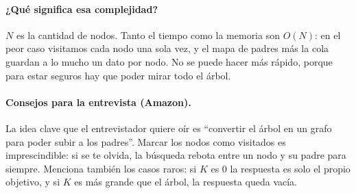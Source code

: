

\paragraph{¿Qué significa esa complejidad?} $N$ es la cantidad de nodos. Tanto el tiempo como la memoria son $O(N)$: en el peor caso visitamos cada nodo una sola vez, y el mapa de padres más la cola guardan a lo mucho un dato por nodo. No se puede hacer más rápido, porque para estar seguros hay que poder mirar todo el árbol.

\paragraph{Consejos para la entrevista (Amazon).} La idea clave que el entrevistador quiere oír es ``convertir el árbol en un grafo para poder subir a los padres''. Marcar los nodos como visitados es imprescindible: si se te olvida, la búsqueda rebota entre un nodo y su padre para siempre. Menciona también los casos raros: si $K$ es 0 la respuesta es solo el propio objetivo, y si $K$ es más grande que el árbol, la respuesta queda vacía.
